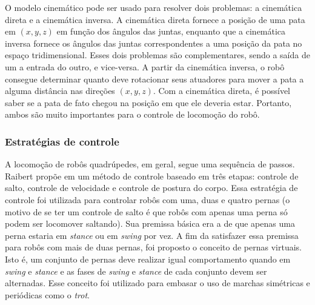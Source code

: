 \documentclass[../main.tex]{subfiles}
\begin{document}
O modelo cinemático pode ser usado para resolver dois problemas: a cinemática direta e a cinemática inversa. A cinemática direta fornece a posição de uma pata em $(x, y, z)$ em função dos ângulos das juntas, enquanto que a cinemática inversa fornece os ângulos das juntas correspondentes a uma posição da pata no espaço tridimensional. Esses dois problemas são complementares, sendo a saída de um a entrada do outro, e vice-versa. A partir da cinemática inversa, o robô consegue determinar quanto deve rotacionar seus atuadores para mover a pata a alguma distância nas direções $(x, y, z)$. Com a cinemática direta, é possível saber se a pata de fato chegou na posição em que ele deveria estar. Portanto, ambos são muito importantes para o controle de locomoção do robô.

\subsubsection{Estratégias de controle}
A locomoção de robôs quadrúpedes, em geral, segue uma sequência de passos. Raibert propõe em \cite{Raibert1986} um método de controle baseado em três etapas: controle de salto, controle de velocidade e controle de postura do corpo. Essa estratégia de controle foi utilizada para controlar robôs com uma, duas e quatro pernas (o motivo de se ter um controle de salto é que robôs com apenas uma perna só podem ser locomover saltando). Sua premissa básica era a de que apenas uma perna estaria em \textit{stance} ou em \textit{swing} por vez. A fim da satisfazer essa premissa para robôs com mais de duas pernas, foi proposto o conceito de pernas virtuais. Isto é, um conjunto de pernas deve realizar igual comportamento quando em \textit{swing} e \textit{stance} e as fases de \textit{swing} e \textit{stance} de cada conjunto devem ser alternadas. Esse conceito foi utilizado para embasar o uso de marchas simétricas e periódicas como o \textit{trot}.
\end{document}
